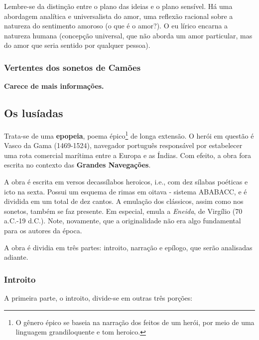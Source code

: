 Lembre-se da distinção entre o plano das ideias e o plano sensível. Há uma abordagem analítica e universalista do amor, uma reflexão racional sobre a natureza do sentimento amoroso (o que é o amor?). O eu lírico encarna a natureza humana (concepção universal, que não aborda um amor particular, mas do amor que seria sentido por qualquer pessoa).

\subsubsection{Vertentes dos sonetos de Camões}

\textbf{Carece de mais informações.}
 
\subsection{Os lusíadas}

Trata-se de uma \textbf{epopeia}, poema épico\footnote{O gênero épico se baseia na narração dos feitos de um herói, por meio de uma linguagem grandiloquente e tom heroico.} de longa extensão. O herói em questão é Vasco da Gama (1469-1524), navegador português responsável por estabelecer uma rota comercial marítima entre a Europa e as Índias. Com efeito, a obra fora escrita no contexto das \textbf{Grandes Navegações}.

A obra é escrita em versos decassílabos heroicos, i.e., com dez sílabas poéticas e icto na sexta. Possui um esquema de rimas em oitava - sistema ABABACC, e é dividida em um total de dez cantos. A emulação dos clássicos, assim como nos sonetos, também se faz presente. Em especial, emula a \textit{Eneida}, de Virgílio (70 a.C.-19 d.C.). Note, novamente, que a originalidade não era algo fundamental para os autores da época.

A obra é dividia em três partes: introito, narração e epílogo, que serão analisadas adiante.

\subsubsection{Introito}

A primeira parte, o introito, divide-se em outras três porções:

